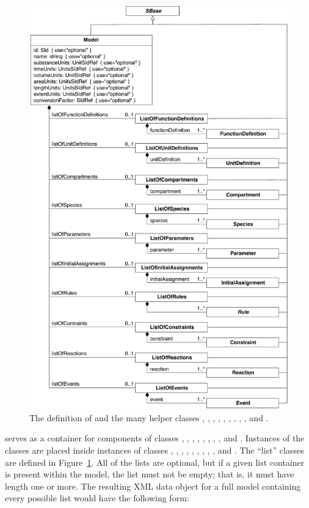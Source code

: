 \begin{figure}[htbp]
  \centering
  \includegraphics[scale=0.75]{figs/model-uml}
  \caption{The definition of \Model and the many helper
      classes \ListOfFunctionDefinitions, \ListOfUnitDefinitions,
      \ListOfCompartments, \ListOfSpecies, \ListOfParameters,
      \ListOfInitialAssignments, \ListOfRules, \ListOfConstraints,
      \ListOfReactions, and \ListOfEvents.}
  \label{fig:model}
\end{figure}

\Model serves as a container for components of classes
\FunctionDefinition, \UnitDefinition, \Compartment, \Species, \Parameter,
\InitialAssignment, \Rule, \Constraint, \Reaction and \Event.
Instances of the classes are placed inside instances of classes
\ListOfFunctionDefinitions, \ListOfUnitDefinitions,
\ListOfCompartments, \ListOfSpecies, \ListOfParameters, \ListOfInitialAssignments,
\ListOfRules, \ListOfConstraints, \ListOfReactions, and
\ListOfEvents.  The ``list'' classes are defined in
Figure~\ref{fig:model}.  All of the lists are optional, but if a
given list container is present within the model, the list must
not be empty; that is, it must have length one or more.  The
resulting XML data object for a full model containing every
possible list would have the following form:

